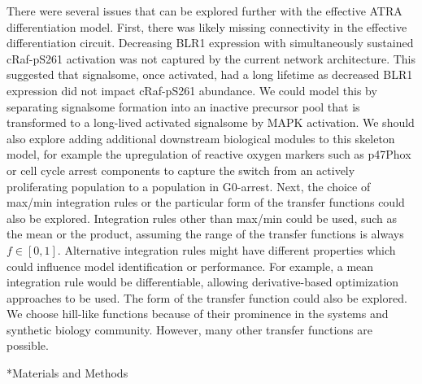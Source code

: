 \documentclass[12pt]{article}
\makeatletter
\renewcommand\section{\@startsection
	{subsection}{2}{0mm}
	{-0.2in}
	{0.05\baselineskip}
	{\normalfont\large\bfseries}}
\makeatother
\begin{document}
There were several issues that can be explored further with the effective ATRA differentiation model.
First, there was likely missing connectivity in the effective differentiation circuit.
Decreasing BLR1 expression with simultaneously sustained cRaf-pS261 activation was not captured by the current network architecture.
This suggested that signalsome, once activated, had a long lifetime as decreased BLR1 expression did not impact cRaf-pS261 abundance.
We could model this by separating signalsome formation into an inactive precursor pool that is transformed to a long-lived activated signalsome by MAPK activation.
We should also explore adding additional downstream biological modules to this skeleton model, for example the upregulation of reactive oxygen markers such as p47Phox or
cell cycle arrest components to capture the switch from an actively proliferating population to a population in G0-arrest.
Next, the choice of max/min integration rules or the particular form of the transfer functions could also be explored.
Integration rules other than max/min could be used, such as the mean or the product, assuming the range of the transfer functions is always $f\in[0,1]$.
Alternative integration rules might have different properties which could influence model identification or performance.
For example, a mean integration rule would be differentiable, allowing derivative-based optimization approaches to be used.
The form of the transfer function could also be explored. We choose hill-like functions because of their
prominence in the systems and synthetic biology community. However, many other transfer functions are possible.

\clearpage

\section*{Materials and Methods}
\end{document}
